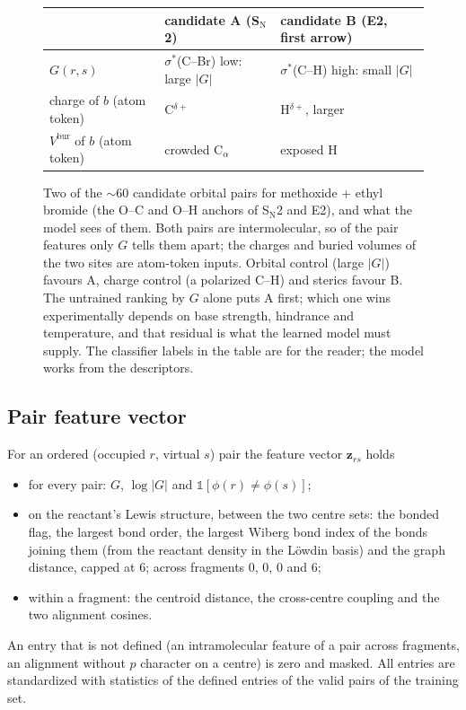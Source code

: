 \documentclass[11pt,a4paper]{article}
\newcommand{\vb}[1]{\bm{#1}}
\begin{document}
\begin{figure}[t]
\vspace{6pt}
\begin{tabular}{@{}lll@{}}
\toprule
 & candidate A (S$_\mathrm{N}$2) & candidate B (E2, first arrow)\\
\midrule
$G(r,s)$ & $\sigma^*$(C--Br) low: large $|G|$ & $\sigma^*$(C--H) high: small $|G|$\\
charge of $b$ (atom token) & C$^{\delta+}$ & H$^{\delta+}$, larger\\
$V^{\mathrm{bur}}$ of $b$ (atom token) & crowded C$_\alpha$ & exposed H\\
\bottomrule
\end{tabular}
\caption{Two of the $\sim$60 candidate orbital pairs for methoxide + ethyl bromide (the O--C and O--H anchors of S$_\mathrm{N}$2 and E2), and what the model sees of them. Both pairs are intermolecular, so of the pair features only $G$ tells them apart; the charges and buried volumes of the two sites are atom-token inputs. Orbital control (large $|G|$) favours A, charge control (a polarized C--H) and sterics favour B. The untrained ranking by $G$ alone puts A first; which one wins experimentally depends on base strength, hindrance and temperature, and that residual is what the learned model must supply. The classifier labels in the table are for the reader; the model works from the descriptors.}
\label{fig:sn2e2}
\end{figure}

\subsection{Pair feature vector}
\label{sec:pairfeat}
For an ordered (occupied $r$, virtual $s$) pair the feature vector $\vb{z}_{rs}$ holds
\begin{itemize}[nosep]
\item for every pair: $G$, $\log|G|$ and $\mathbb{1}[\phi(r)\ne\phi(s)]$;
\item on the reactant's Lewis structure, between the two centre sets: the bonded flag, the largest bond order, the largest Wiberg bond index of the bonds joining them (from the reactant density in the L\"owdin basis) and the graph distance, capped at $6$; across fragments $0$, $0$, $0$ and $6$;
\item within a fragment: the centroid distance, the cross-centre coupling and the two alignment cosines.
\end{itemize}
An entry that is not defined (an intramolecular feature of a pair across fragments, an alignment without $p$ character on a centre) is zero and masked. All entries are standardized with statistics of the defined entries of the valid pairs of the training set.
\end{document}

